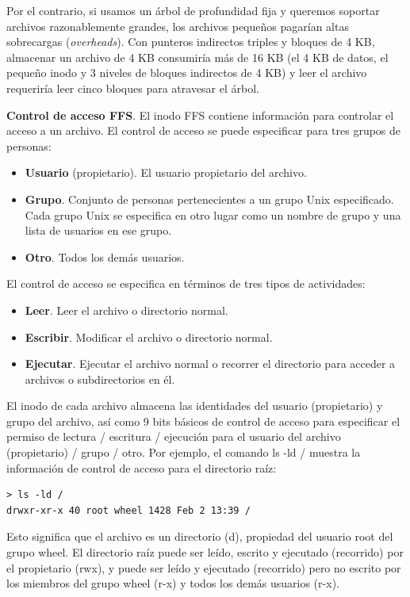 \documentclass[10pt]{book}
\begin{document}
\begin{enumerate}
Por el contrario, si usamos un árbol de profundidad fija y queremos soportar archivos razonablemente grandes, los archivos pequeños pagarían altas sobrecargas (\textit{overheads}). Con punteros indirectos triples y bloques de 4 KB, almacenar un archivo de 4 KB consumiría más de 16 KB (el 4 KB de datos, el pequeño inodo y 3 niveles de bloques indirectos de 4 KB) y leer el archivo requeriría leer cinco bloques para atravesar el árbol.
\end{enumerate}

\textbf{Control de acceso FFS}. El inodo FFS contiene información para controlar el acceso a un archivo. El control de acceso se puede especificar para tres grupos de personas:
\begin{itemize}
\item \textbf{Usuario} (propietario). El usuario propietario del archivo.
\item \textbf{Grupo}. Conjunto de personas pertenecientes a un grupo Unix especificado. Cada grupo Unix se especifica en otro lugar como un nombre de grupo y una lista de usuarios en ese grupo.
\item \textbf{Otro}. Todos los demás usuarios.
\end{itemize}

El control de acceso se especifica en términos de tres tipos de actividades:
\begin{itemize}
\item \textbf{Leer}. Leer el archivo o directorio normal.
\item \textbf{Escribir}. Modificar el archivo o directorio normal.
\item \textbf{Ejecutar}. Ejecutar el archivo normal o recorrer el directorio para acceder a archivos o subdirectorios en él.
\end{itemize}

El inodo de cada archivo almacena las identidades del usuario (propietario) y grupo del archivo, así como 9 bits básicos de control de acceso para especificar el permiso de lectura / escritura / ejecución para el usuario del archivo (propietario) / grupo / otro. Por ejemplo, el comando {\mf ls -ld /} muestra la información de control de acceso para el directorio raíz:

\begin{lstlisting}[style=Bash,numbers=none]
> ls -ld /
drwxr-xr-x 40 root wheel 1428 Feb 2 13:39 /
\end{lstlisting}

Esto significa que el archivo es un directorio ({\mf d}), propiedad del usuario {\mf root} del grupo {\mf wheel}. El directorio raíz puede ser leído, escrito y ejecutado (recorrido) por el propietario ({\mf rwx}), y puede ser leído y ejecutado (recorrido) pero no escrito por los miembros del grupo {\mf wheel} ({\mf r-x}) y todos los demás usuarios ({\mf r-x}).
\end{document}

